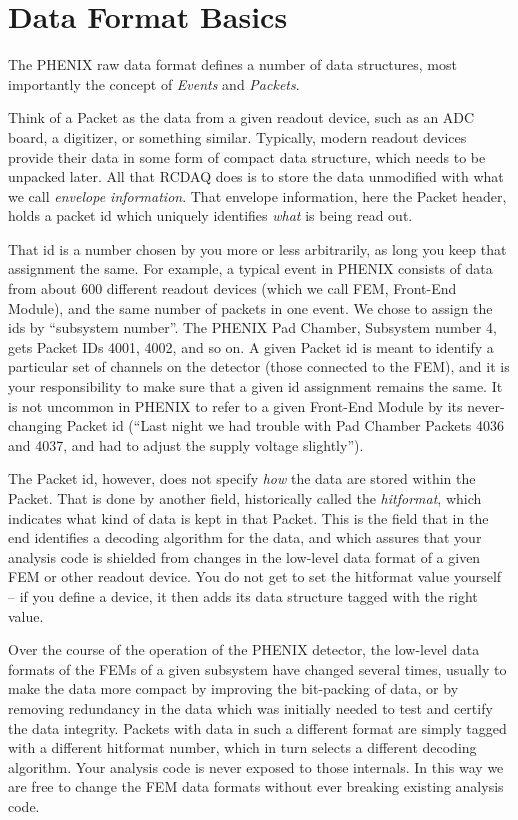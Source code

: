 \documentclass{article}[11pt]
\begin{document}
\section{Data Format Basics}

The PHENIX raw data format defines a number of data structures, most
importantly the concept of \emph{Events} and \emph{Packets}.

Think of a Packet as the data from a given readout device, such as an
ADC board, a digitizer, or something similar. Typically, modern
readout devices provide their data in some form of compact data
structure, which needs to be unpacked later. All that RCDAQ does is to
store the data unmodified with what we call \emph{envelope
  information}. That envelope information, here the Packet header,
holds a packet id which uniquely identifies \emph{what} is being read
out.

That id is a number chosen by you more or less arbitrarily, as long 
you keep that assignment the same. For example, a typical event in
PHENIX consists of data from about 600 different readout devices
(which we call FEM, Front-End Module), and the same number of packets
in one event. We chose to assign the ids by ``subsystem number''.  The
PHENIX Pad Chamber, Subsystem number 4, gets Packet IDs 4001, 4002,
and so on. A given Packet id is meant to identify a particular set of
channels on the detector (those connected to the FEM), and it is your
responsibility to make sure that a given id assignment remains the
same. It is not uncommon in PHENIX to refer to a given Front-End
Module by its never-changing Packet id (``Last night we had trouble
with Pad Chamber Packets 4036 and 4037, and had to adjust the supply
voltage slightly'').

The Packet id, however, does not specify \emph{how} the data are
stored within the Packet. That is done by another field, historically
called the \emph{hitformat}, which indicates what kind of data is kept
in that Packet. This is the field that in the end identifies a
decoding algorithm for the data, and which assures that your analysis
code is shielded from changes in the low-level data format of a given
FEM or other readout device. You do not get to set the hitformat value
yourself -- if you define a device, it then adds its data structure
tagged with the right value.

Over the course of the operation of the PHENIX detector, the low-level
data formats of the FEMs of a given subsystem have changed several
times, usually to make the data more compact by improving the
bit-packing of data, or by removing redundancy in the data which was
initially needed to test and certify the data integrity. Packets with
data in such a different format are simply tagged with a different
hitformat number, which in turn selects a different decoding
algorithm. Your analysis code is never exposed to those internals. In
this way we are free to change the FEM data formats without ever
breaking existing analysis code.
\end{document}
